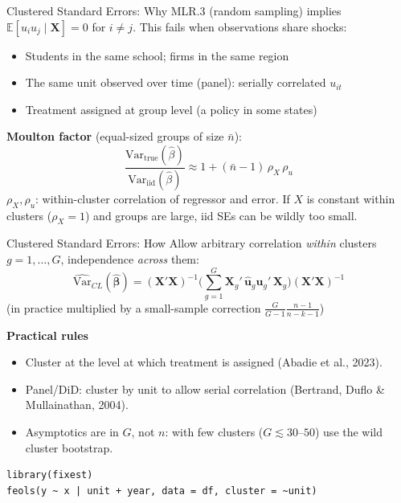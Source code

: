 \documentclass[9pt,aspectratio=169]{beamer}
\newcommand{\E}{\mathbb{E}}
\newcommand{\Var}{\mathrm{Var}}
\begin{document}
\begin{frame}{Clustered Standard Errors: Why}
\linespread{1.2}\selectfont
  MLR.3 (random sampling) implies $\E[u_iu_j\mid\bm X]=0$ for $i\neq j$. This fails when observations share shocks:
  \begin{itemize}
    \item Students in the same school; firms in the same region
    \item The same unit observed over time (panel): serially correlated $u_{it}$
    \item Treatment assigned at group level (a policy in some states)
  \end{itemize}
  \medskip
  \textbf{Moulton factor} (equal-sized groups of size $\bar n$):
  \[
    \frac{\Var_{\text{true}}(\hat\beta)}{\Var_{\text{iid}}(\hat\beta)} \approx 1 + (\bar n-1)\,\rho_X\,\rho_u
  \]
  $\rho_X,\rho_u$: within-cluster correlation of regressor and error. If $X$ is constant within clusters ($\rho_X=1$) and groups are large, iid SEs can be wildly too small.
\end{frame}

\begin{frame}[fragile]{Clustered Standard Errors: How}
\linespread{1.2}\selectfont
  Allow arbitrary correlation \emph{within} clusters $g=1,\dots,G$, independence \emph{across} them:
  \[
    \widehat{\Var}_{CL}(\hat{\bm\beta})=(\bm X'\bm X)^{-1}\Big(\sum_{g=1}^{G}\bm X_g'\,\hat{\bm u}_g\hat{\bm u}_g'\,\bm X_g\Big)(\bm X'\bm X)^{-1}
  \]
  (in practice multiplied by a small-sample correction $\frac{G}{G-1}\frac{n-1}{n-k-1}$)
  \medskip

  \textbf{Practical rules}
  \begin{itemize}
    \item Cluster at the level at which treatment is assigned (Abadie et al., 2023).
    \item Panel/DiD: cluster by unit to allow serial correlation (Bertrand, Duflo \& Mullainathan, 2004).
    \item Asymptotics are in $G$, not $n$: with few clusters ($G\lesssim 30$--$50$) use the wild cluster bootstrap.
  \end{itemize}
  \begin{lstlisting}
library(fixest)
feols(y ~ x | unit + year, data = df, cluster = ~unit)
  \end{lstlisting}
\end{frame}
\end{document}
